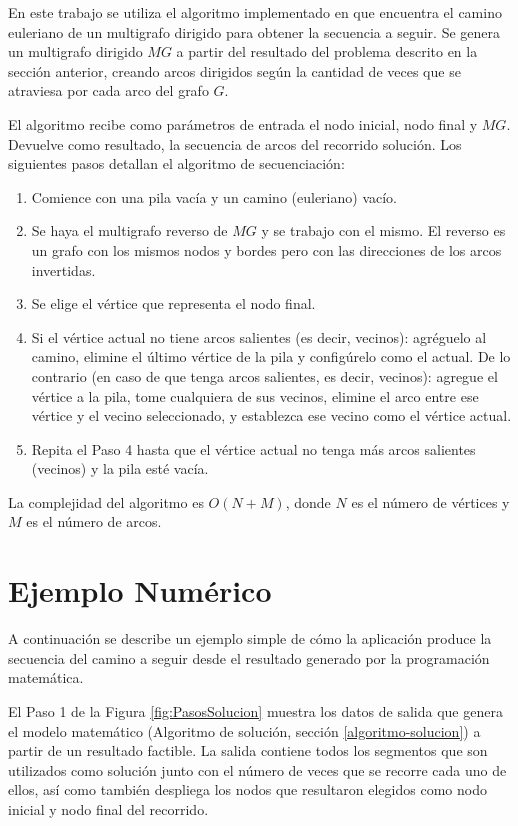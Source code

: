 En este trabajo se utiliza el algoritmo implementado en \cite{RiveraHazim2015APath} que encuentra el camino euleriano de un multigrafo dirigido para obtener la secuencia a seguir. Se genera un multigrafo dirigido $MG$ a partir del resultado del problema descrito en la sección anterior, creando arcos dirigidos según la cantidad de veces que se atraviesa por cada arco del grafo $G$. 

El algoritmo recibe como parámetros de entrada el nodo inicial, nodo final y $MG$. Devuelve como resultado, la secuencia de arcos del recorrido solución. Los siguientes pasos detallan el algoritmo de secuenciación:

\begin{enumerate}
    \item Comience con una pila vacía y un camino (euleriano) vacío. 
    \item Se haya el multigrafo reverso de $MG$ y se trabajo con el mismo. El reverso es un grafo con los mismos nodos y bordes pero con las direcciones de los arcos invertidas.
    \item Se elige el vértice que representa el nodo final.
    \item Si el vértice actual no tiene arcos salientes (es decir, vecinos): agréguelo al camino, elimine el último vértice de la pila y configúrelo como el actual. De lo contrario (en caso de que tenga arcos salientes, es decir, vecinos): agregue el vértice a la pila, tome cualquiera de sus vecinos, elimine el arco entre ese vértice y el vecino seleccionado, y establezca ese vecino como el vértice actual.
    \item Repita el Paso 4 hasta que el vértice actual no tenga más arcos salientes (vecinos) y la pila esté vacía.
\end{enumerate}

La complejidad del algoritmo es $O(N + M)$, donde $N$ es el número de vértices y $M$ es el número de arcos.

\section{Ejemplo Numérico}
A continuación se describe un ejemplo simple de cómo la aplicación produce la secuencia del camino a seguir desde el resultado generado por la programación matemática.

El Paso 1 de la Figura \ref{fig:PasosSolucion} muestra los datos de salida que genera el modelo matemático (Algoritmo  de  solución, sección \ref{algoritmo-solucion}) a partir de un resultado factible. La salida contiene todos los segmentos que son utilizados como solución junto con el número de veces que se recorre cada uno de ellos, así como también despliega los nodos que resultaron elegidos como nodo inicial y nodo final del recorrido. 


